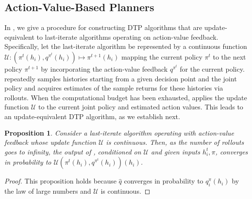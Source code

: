 \documentclass{article} %
\theoremstyle{plain}
\newtheorem{proposition}[theorem]{Proposition}
\theoremstyle{definition}
\theoremstyle{remark}
\begin{document}
\subsection{Action-Value-Based Planners}\label{sec:action value based planners}

\begin{figure}
\vspace{-7mm}
\end{figure}

In , we give a procedure for constructing DTP algorithms that are update-equivalent to last-iterate algorithms operating on action-value feedback. Specifically, let the last-iterate algorithm be represented by a continuous function $\mathcal{U} \colon (\pi^t(h_i), q^{\pi^t}(h_i)) \mapsto \pi^{t+1}(h_i)$ mapping the current policy $\pi^t$ to the next policy $\pi^{t+1}$ by incorporating the action-value feedback $q^{\pi^t}$ for the current policy. 
 repeatedly samples histories starting from a given decision point and the joint policy and acquires estimates of the sample returns for these histories via rollouts. 
When the computational budget has been exhausted,  applies the update function $\mathcal{U}$ to the current joint policy and estimated action values. This leads to an update-equivalent DTP algorithm, as we establish next.

\begin{proposition} \label{prop:equiv}
Consider a last-iterate algorithm operating with action-value feedback whose update function $\mathcal{U}$ is continuous.
Then, as the number of rollouts goes to infinity, the output of , conditioned on $\mathcal{U}$ and given inputs $h_i^t, \pi$, converges in probability to $\mathcal{U}(\pi^t(h_i), q^{\pi^t}(h_i))(h_i)$.
\end{proposition}
\begin{proof}
This proposition holds because $\hat{q}$ converges in probability to $q_i^{\pi}(h_i)$ by the law of large numbers and $\mathcal{U}$ is continuous.
\end{proof}
\end{document}
